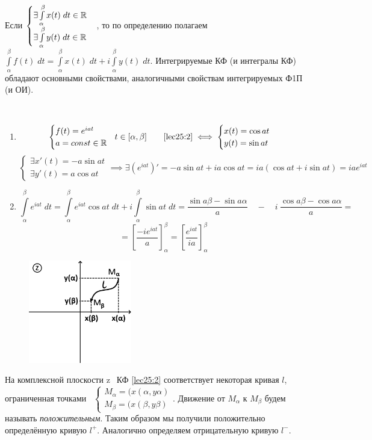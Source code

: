 \documentclass[../../main.tex]{subfiles}
\begin{document}
Если $\begin{cases}
	\exists \int\limits_{\alpha}^{\beta} x(t)\;dt  \in \mathbb{R} \\
	\exists \int\limits_{\alpha}^{\beta} y(t)\;dt  \in \mathbb{R}
\end{cases}$, то по определению полагаем
$\int\limits_{\alpha}^{\beta} f(t)\;dt = 
\int\limits_{\alpha}^{\beta} x(t)\;dt + i\int\limits_{\alpha}^{\beta} y(t)\;dt$.
Интегрируемые КФ (и интегралы КФ) обладают
основными свойствами, аналогичными 
свойствам интегрируемых Ф1П (и ОИ).
\begin{exmps}\  
\begin{enumerate}
\item\[\begin{cases}
	f(t) = e^{iat} \\
	a = const \in \mathbb{R}
\end{cases}\!\! t \in [\alpha, \beta]
\qquad
\eqref{lec25:2} \iff 
\begin{cases}
	x(t) = \cos{at} \\
	y(t) = \sin{at}
\end{cases}  
\]
\[\begin{cases}
	\exists x'(t) = -a\sin{at}  \\
	\exists y'(t) = a\cos{at}
\end{cases}\implies \exists \left(e^{iat} \right)' = -a\sin{at} + ia\cos{at} =
 ia(\cos{at} + i\sin{at}) = iae^{iat}
\]
\item\[
\int\limits_{\alpha}^{\beta}e^{iat}\;dt =
\int\limits_{\alpha}^{\beta}e^{iat}\cos{at}\;dt +
 i\int\limits_{\alpha}^{\beta}\sin{at}\;dt = 
 \frac{\sin{a\beta} - \sin{a\alpha}}{a}\quad  - \quad  
 i\ \frac{\cos{a\beta} - \cos{a\alpha}}{a} = \]\[
= \left[ \frac{-i{e}^{iat}}{a} \right]_{\alpha}^{\beta}= 
\left[ \frac{{e}^{iat}}{ia} \right]_{\alpha}^{\beta}
\]
\end{enumerate}
\end{exmps}

\begin{figure}
\includegraphics[width=0.4\textwidth]{lec25_1.png}
\end{figure}
На комплексной плоскости \textcircled{z}\  КФ \eqref{lec25:2} соответствует
некоторая кривая $l$, ограниченная точками \  $
\begin{cases}
	M_{\alpha} = (x({\alpha}, y{\alpha}) \\
	M_{\beta} = (x({\beta}, y{\beta})
\end{cases} $. Движение от $M_{\alpha}$ к $M_{\beta}$ будем называть 
\emph{положительным}. Таким образом мы получили положительно
определённую кривую $l^+$. Аналогично определяем отрицательную
кривую $l^-$.
\end{document}
